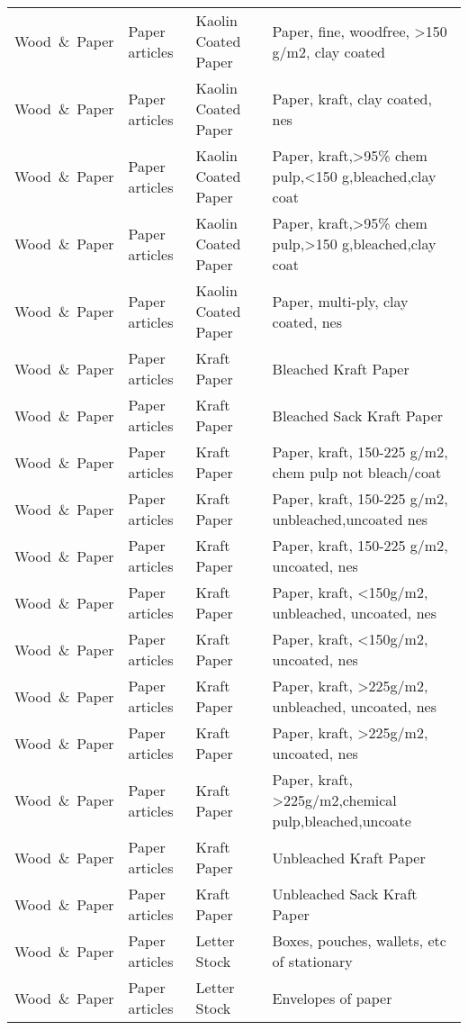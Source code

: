 \begin{appendices}
\begin{xltabular}{\textwidth}{|p{0.10\textwidth}|p{0.25\textwidth}|p{0.20\textwidth}|p{0.35\textwidth}|}
			Wood\ \&\ Paper & Paper articles & Kaolin Coated Paper & Paper, fine, woodfree, >150 g/m2, clay coated \\
			Wood\ \&\ Paper & Paper articles & Kaolin Coated Paper & Paper, kraft, clay coated, nes \\
			Wood\ \&\ Paper & Paper articles & Kaolin Coated Paper & Paper, kraft,>95\% chem pulp,<150 g,bleached,clay coat \\
			Wood\ \&\ Paper & Paper articles & Kaolin Coated Paper & Paper, kraft,>95\% chem pulp,>150 g,bleached,clay coat \\
			Wood\ \&\ Paper & Paper articles & Kaolin Coated Paper & Paper, multi-ply, clay coated, nes \\
			Wood\ \&\ Paper & Paper articles & Kraft Paper & Bleached Kraft Paper \\
			Wood\ \&\ Paper & Paper articles & Kraft Paper & Bleached Sack Kraft Paper \\
			Wood\ \&\ Paper & Paper articles & Kraft Paper & Paper, kraft, 150-225 g/m2, chem pulp not bleach/coat \\
			Wood\ \&\ Paper & Paper articles & Kraft Paper & Paper, kraft, 150-225 g/m2, unbleached,uncoated nes \\
			Wood\ \&\ Paper & Paper articles & Kraft Paper & Paper, kraft, 150-225 g/m2, uncoated, nes \\
			Wood\ \&\ Paper & Paper articles & Kraft Paper & Paper, kraft, <150g/m2, unbleached, uncoated, nes \\
			Wood\ \&\ Paper & Paper articles & Kraft Paper & Paper, kraft, <150g/m2, uncoated, nes \\
			Wood\ \&\ Paper & Paper articles & Kraft Paper & Paper, kraft, >225g/m2, unbleached, uncoated, nes \\
			Wood\ \&\ Paper & Paper articles & Kraft Paper & Paper, kraft, >225g/m2, uncoated, nes \\
			Wood\ \&\ Paper & Paper articles & Kraft Paper & Paper, kraft, >225g/m2,chemical pulp,bleached,uncoate \\
			Wood\ \&\ Paper & Paper articles & Kraft Paper & Unbleached Kraft Paper \\
			Wood\ \&\ Paper & Paper articles & Kraft Paper & Unbleached Sack Kraft Paper \\
			Wood\ \&\ Paper & Paper articles & Letter Stock & Boxes, pouches, wallets, etc of stationary \\
			Wood\ \&\ Paper & Paper articles & Letter Stock & Envelopes of paper \\

\end{xltabular}
\end{appendices}
